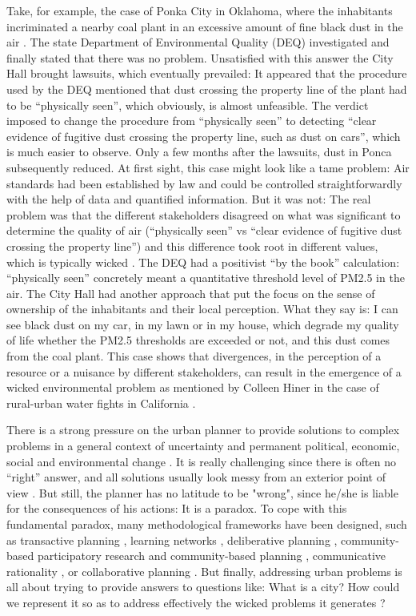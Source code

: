 \documentclass[10pt,a4paper]{article}
\begin{document}
\begin{multicols}{2}
Take, for example, the case of Ponka City in Oklahoma, where the inhabitants incriminated a nearby coal plant in an excessive amount of fine black dust in the air \citep{r47}. The state Department of Environmental Quality (DEQ) investigated and finally stated that there was no problem. Unsatisfied with this answer the City Hall brought lawsuits, which eventually prevailed: It appeared that the procedure used by the DEQ mentioned that dust crossing the property line of the plant had to be ``physically seen'', which obviously, is almost unfeasible. The verdict imposed to change the procedure from ``physically seen'' to detecting ``clear evidence of fugitive dust crossing the property line, such as dust on cars'', which is much easier to observe. Only a few months after the lawsuits, dust in Ponca subsequently reduced. At first sight, this case might look like a tame problem: Air standards had been established by law and could be controlled straightforwardly with the help of data and quantified information. But it was not: The real problem was that the different stakeholders disagreed on what was significant to determine the quality of air (``physically seen'' vs ``clear evidence of fugitive dust crossing the property line'') and this difference took root in different values, which is typically wicked \citep{r48}. The DEQ had a positivist ``by the book'' calculation: ``physically seen'' concretely meant a quantitative threshold level of PM2.5 in the air. The City Hall had another approach that put the focus on the sense of ownership of the inhabitants and their local perception. What they say is: I can see black dust on my car, in my lawn or in my house, which degrade my quality of life whether the PM2.5 thresholds are exceeded or not, and this dust comes from the coal plant. This case shows that divergences, in the perception of a resource or a nuisance by different stakeholders, can result in the emergence of a wicked environmental problem as mentioned by Colleen Hiner in the case of rural-urban water fights in California \citep{r49}.

There is a strong pressure on the urban planner to provide solutions to complex problems in a general context of uncertainty and permanent political, economic, social and environmental change \citep{r50}. It is really challenging since there is often no ``right'' answer, and all solutions usually look messy from an exterior point of view \citep{r51, r52}. But still, the planner has no latitude to be "wrong", since he/she is liable for the consequences of his actions: It is a paradox. To cope with this fundamental paradox, many methodological frameworks have been designed, such as transactive planning \citep{r53}, learning networks \citep{r54}, deliberative planning \citep{r55}, community-based participatory research and community-based planning \citep{r56}, communicative rationality \citep{r57, r58}, or collaborative planning \citep{r59}. But finally, addressing urban problems is all about trying to provide answers to questions like: What is a city? How could we represent it so as to address effectively the wicked problems it generates \citep{r60}?


\end{multicols}
\end{document}
